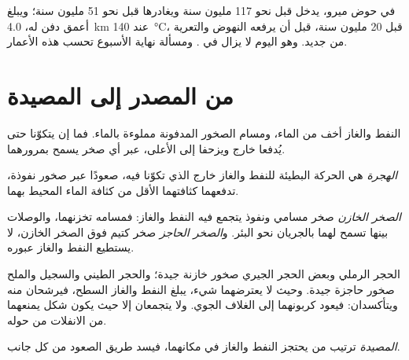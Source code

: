 في حوض ميرو، يدخل   قبل نحو 117
مليون سنة ويغادرها قبل نحو 51 مليون سنة؛ ويبلغ أعمق
دفن له، \qty{4.0}{km} عند \qty{140}{\degreeCelsius}، قبل 20 مليون سنة،
قبل أن يرفعه النهوض والتعرية من جديد. وهو اليوم لا يزال في . ومسألة نهاية الأسبوع تحسب هذه الأعمار.

\section{من المصدر إلى المصيدة}

النفط والغاز أخف من الماء، ومسام الصخور المدفونة مملوءة
بالماء. فما إن يتكوّنا حتى يُدفعا خارج  ويزحفا إلى الأعلى،
عبر أي صخر يسمح بمرورهما.

\begin{definition}[الهجرة]\label{def:g11:fossil-fuel-geology:migration}
\emph{الهجرة} هي الحركة البطيئة
للنفط والغاز خارج  الذي تكوّنا فيه، صعودًا عبر
صخور نفوذة، تدفعهما كثافتهما الأقل من كثافة الماء المحيط بهما.
\end{definition}

\begin{definition}\label{def:g11:fossil-fuel-geology:reservoir}
\emph{الصخر الخازن} صخر مسامي ونفوذ
يتجمع فيه النفط والغاز: فمسامه تخزنهما، والوصلات بينها
تسمح لهما بالجريان نحو البئر. و\emph{الصخر الحاجز} صخر
كتيم فوق الصخر الخازن، لا يستطيع النفط والغاز
عبوره.
\end{definition}

الحجر الرملي وبعض الحجر الجيري صخور خازنة جيدة؛ والحجر الطيني والسجيل
والملح صخور حاجزة جيدة. وحيث لا يعترضهما شيء، يبلغ النفط والغاز
السطح، فيرشحان منه ويتأكسدان: فيعود كربونهما إلى
الغلاف الجوي. ولا يتجمعان إلا حيث يكون  شكل يمنعهما من
الانفلات من حوله.

\begin{definition}[المصيدة]\label{def:g11:fossil-fuel-geology:trap}
\emph{المصيدة} ترتيب من 
 يحتجز النفط والغاز في مكانهما، فيسد طريق الصعود من كل جانب.
\end{definition}

